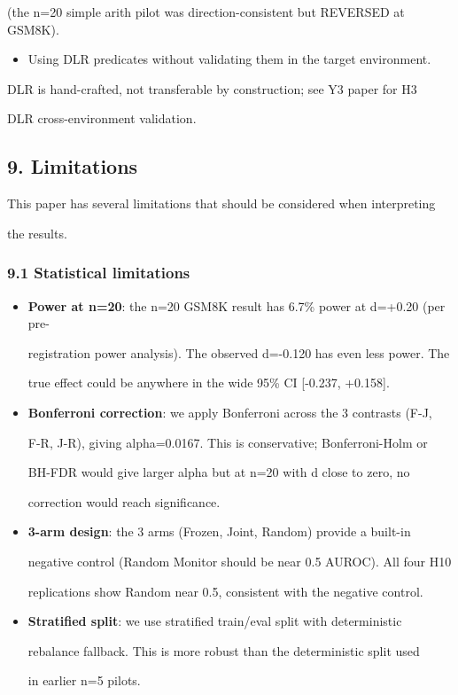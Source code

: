 \documentclass[
]{article}
\providecommand{\tightlist}{%
  \setlength{\itemsep}{0pt}\setlength{\parskip}{0pt}}
\begin{document}
(the n=20 simple arith pilot was direction-consistent but REVERSED at
GSM8K).

\begin{itemize}
\tightlist
\item
  Using DLR predicates without validating them in the target
  environment.
\end{itemize}

DLR is hand-crafted, not transferable by construction; see Y3 paper for
H3

DLR cross-environment validation.

\subsection{9. Limitations}\label{limitations}

This paper has several limitations that should be considered when
interpreting

the results.

\subsubsection{9.1 Statistical
limitations}\label{statistical-limitations}

\begin{itemize}
\item
  \textbf{Power at n=20}: the n=20 GSM8K result has 6.7\% power at
  d=+0.20 (per pre-

  registration power analysis). The observed d=-0.120 has even less
  power. The

  true effect could be anywhere in the wide 95\% CI {[}-0.237,
  +0.158{]}.
\item
  \textbf{Bonferroni correction}: we apply Bonferroni across the 3
  contrasts (F-J,

  F-R, J-R), giving alpha=0.0167. This is conservative; Bonferroni-Holm
  or

  BH-FDR would give larger alpha but at n=20 with d close to zero, no

  correction would reach significance.
\item
  \textbf{3-arm design}: the 3 arms (Frozen, Joint, Random) provide a
  built-in

  negative control (Random Monitor should be near 0.5 AUROC). All four
  H10

  replications show Random near 0.5, consistent with the negative
  control.
\item
  \textbf{Stratified split}: we use stratified train/eval split with
  deterministic

  rebalance fallback. This is more robust than the deterministic split
  used

  in earlier n=5 pilots.
\end{itemize}
\end{document}
